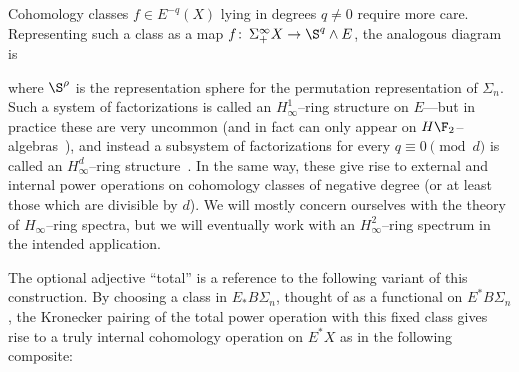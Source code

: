 Cohomology classes \(f \in E^{-q}(X)\) lying in degrees \(q \ne 0\) require more care.  Representing such a class as a map \(f\co \Susp^\infty_+ X \to \S^q \sm E\), the analogous diagram is
\begin{center}
\end{center}
where \(\S^\rho\) is the representation sphere for the permutation representation of \(\Sigma_n\).  Such a system of factorizations is called an \(H_\infty^1\)--ring structure on \(E\)---but in practice these are very uncommon (and in fact can only appear on \(H\F_2\)--algebras~\cite[Section VII.6.1]{BMMS}), and instead a subsystem of factorizations for every \(q \equiv 0 \pmod d\) is called an \(H_\infty^d\)--ring structure~\cite[Definition I.4.3]{BMMS}.  In the same way, these give rise to external and internal power operations on cohomology classes of negative degree (or at least those which are divisible by \(d\)).  We will mostly concern ourselves with the theory of \(H_\infty\)--ring spectra, but we will eventually work with an \(H_\infty^2\)--ring spectrum in the intended application.

\begin{remark}\label{RestrictingSteenrodOpToBasepoint}
The optional adjective ``total'' is a reference to the following variant of this construction.  By choosing a class in \(E_* B\Sigma_n\), thought of as a functional on \(E^* B\Sigma_n\), the Kronecker pairing of the total power operation with this fixed class gives rise to a truly internal cohomology operation on \(E^* X\) as in the following composite:
\begin{center}
\end{center}
\end{remark}

